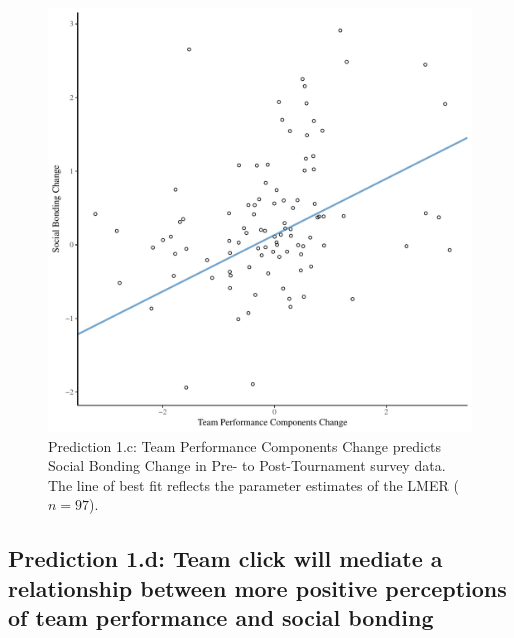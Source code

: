 \begin{CJK}{UTF8}{gbsn}
  \begin{figure}[htbp]
    \centering
  \includegraphics[scale=.5]{images/jasBondDeltaModelSlope.pdf}
    \caption{Prediction 1.c: Team Performance Components Change predicts Social Bonding Change in Pre- to Post-Tournament survey data. The line of best fit reflects the parameter estimates of the LMER ($n = 97$).}
    \label{fig:jasBondDeltaModelSlope}
  \end{figure}








\subsection{Prediction 1.d: Team click will mediate a relationship between more positive perceptions of team performance and social bonding}



\end{CJK}
